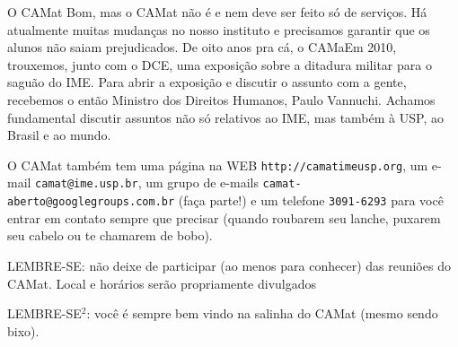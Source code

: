 \begin{secao}{O CAMat}
Bom, mas o CAMat não é e nem deve ser feito só de serviços. Há atualmente
muitas mudanças no nosso instituto e precisamos garantir que os alunos não
saiam prejudicados. De oito anos pra cá, o CAMaEm 2010, trouxemos, junto com o
DCE, uma exposição sobre a ditadura militar para o saguão do IME. Para abrir a
exposição e discutir o assunto com a gente, recebemos o então Ministro dos
Direitos Humanos, Paulo Vannuchi. Achamos fundamental discutir assuntos não só
relativos ao IME, mas também à USP, ao Brasil e ao mundo.


O CAMat também tem uma página na WEB {\tt http://camatimeusp.org}, um
e-mail {\tt camat@ime.usp.br}, um grupo de e-mails {\tt camat-aberto@googlegroups.com.br}
(faça parte!) e um telefone {\tt 3091-6293} para você entrar em contato sempre
que precisar (quando roubarem seu lanche, puxarem seu cabelo ou te chamarem de
bobo).

LEMBRE-SE: não deixe de participar (ao menos para conhecer) das reuniões do
CAMat. Local e horários serão propriamente divulgados

LEMBRE-SE$^2$: você é sempre bem vindo na salinha do CAMat (mesmo sendo
bixo).

\end{secao}
